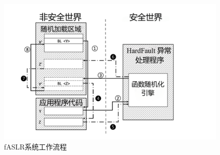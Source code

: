 \documentclass[12pt,a4paper]{ctexart}
\numberwithin{figure}{section}
\begin{document}
\begin{figure}[H]
    \centering
    \includegraphics[scale=0.4]{graph/workflow.png}
    \caption{fASLR系统工作流程}
    \label{fig:workflow}
\end{figure}
\end{document}
